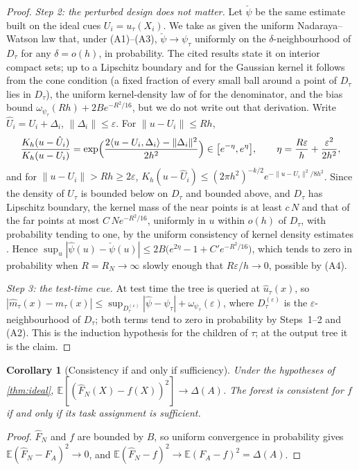 \documentclass[11pt]{article}
\newtheorem{corollary}[theorem]{Corollary}
\theoremstyle{definition}
\theoremstyle{remark}
\newcommand{\E}{\mathbb{E}}
\begin{document}
\begin{proof}
\emph{Step 2: the perturbed design does not matter.}  Let $\check\psi$ be the same
estimate built on the ideal cues $U_i=u_\tau(X_i)$.  We take as given the uniform Nadaraya--Watson law that, under (A1)--(A3),
$\check\psi\to\psi_\tau$ uniformly on the $\delta$-neighbourhood of $D_\tau$ for any
$\delta=o(h)$, in probability.  The cited results \citep{devroye1978,mack1982} state it on
interior compact sets; up to a Lipschitz boundary and for the Gaussian kernel it follows from
the cone condition (a fixed fraction of every small ball around a point of $D_\tau$ lies in
$D_\tau$), the uniform kernel-density law of \citet{einmahl2005} for the denominator, and the
bias bound $\omega_{\psi_\tau}(Rh)+2Be^{-R^2/16}$, but we do not write out that derivation.  Write $\hat U_i=U_i+\Delta_i$, $\|\Delta_i\|\le\varepsilon$.
For $\|u-U_i\|\le Rh$,
\[
  \frac{K_h(u-\hat U_i)}{K_h(u-U_i)}=\exp\Bigl(\frac{2\langle u-U_i,\Delta_i\rangle-\|\Delta_i\|^2}{2h^2}\Bigr)
  \in\bigl[e^{-\eta},e^{\eta}\bigr],\qquad \eta=\frac{R\varepsilon}{h}+\frac{\varepsilon^2}{2h^2},
\]
and for $\|u-U_i\|>Rh\ge2\varepsilon$, $K_h(u-\hat U_i)\le(2\pi h^2)^{-k/2}
e^{-\|u-U_i\|^2/8h^2}$.  Since the density of $U_\tau$ is bounded below on $D_\tau$ and
bounded above, and $D_\tau$ has Lipschitz boundary, the kernel mass of the near points
is at least $c\,N$ and that of the far points at most $C\,Ne^{-R^2/16}$, uniformly in $u$
within $o(h)$ of $D_\tau$, with probability tending to one, by the uniform consistency
of kernel density estimates \citep{einmahl2005}.
Hence $\sup_u|\hat\psi(u)-\check\psi(u)|\le2B\bigl(e^{2\eta}-1+C'e^{-R^2/16}\bigr)$, which
tends to zero in probability when $R=R_N\to\infty$ slowly enough that
$R\varepsilon/h\to0$, possible by (A4).

\emph{Step 3: the test-time cue.}  At test time the tree is queried at $\hat u_\tau(x)$,
so $|\hat m_\tau(x)-m_\tau(x)|\le\sup_{D_\tau^{(\varepsilon)}}|\hat\psi-\psi_\tau|+
\omega_{\psi_\tau}(\varepsilon)$, where $D_\tau^{(\varepsilon)}$ is the
$\varepsilon$-neighbourhood of $D_\tau$; both terms tend to zero in probability by
Steps~1--2 and (A2).  This is the induction hypothesis for the children of $\tau$; at
the output tree it is the claim.
\end{proof}

\begin{corollary}[Consistency if and only if sufficiency]\label{cor:iff}
Under the hypotheses of \cref{thm:ideal}, $\E[(\hat F_N(X)-f(X))^2]\to\Delta(A)$.  The
forest is consistent for $f$ if and only if its task assignment is sufficient.
\end{corollary}
\begin{proof}
$\hat F_N$ and $f$ are bounded by $B$, so uniform convergence in probability gives
$\E(\hat F_N-F_A)^2\to0$, and $\E(\hat F_N-f)^2\to\E(F_A-f)^2=\Delta(A)$.
\end{proof}
\end{document}
